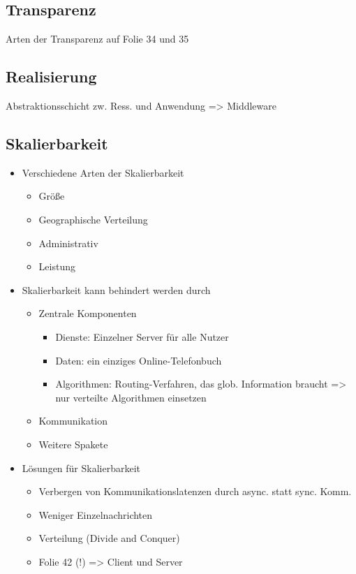 \subsection{Transparenz}
Arten der Transparenz auf Folie 34 und 35

\subsection{Realisierung}
Abstraktionsschicht zw. Ress. und Anwendung => Middleware

\subsection{Skalierbarkeit}

\begin{itemize}
	\item Verschiedene Arten der Skalierbarkeit
		\begin{itemize}
			\item Größe
			\item Geographische Verteilung
			\item Administrativ
			\item Leistung
		\end{itemize}
	\item Skalierbarkeit kann behindert werden durch
		\begin{itemize}
			\item Zentrale Komponenten
				\begin{itemize}
					\item Dienste: Einzelner Server für alle Nutzer
					\item Daten: ein einziges Online-Telefonbuch
					\item Algorithmen: Routing-Verfahren, das glob. Information braucht => nur verteilte Algorithmen einsetzen
				\end{itemize}
			\item Kommunikation
			\item Weitere Spakete
		\end{itemize}
	\item Lösungen für Skalierbarkeit
		\begin{itemize}
			\item Verbergen von Kommunikationslatenzen durch async. statt sync. Komm.
			\item Weniger Einzelnachrichten
			\item Verteilung (Divide and Conquer)
			\item Folie 42 (!) => Client und Server

\end{itemize}
\end{itemize}
